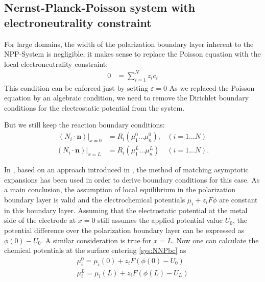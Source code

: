 \documentclass[12pt,oneside,reqno]{amsart}
\numberwithin{equation}{section}
\begin{document}
\subsection{Nernst-Planck-Poisson   system    with   electroneutrality constraint} 
For  large  domains, the  width  of  the polarization  boundary  layer
inherent to  the NPP-System is  negligible, it makes sense  to replace
the Poisson equation with the local electroneutrality constraint:
\begin{align}
  0&= \sum_{i=1}^N z_i c_i \label{eq:eneu}
\end{align}
This condition can be enforced just by setting  $\varepsilon=0$
As we replaced the Poisson equation by an algebraic condition, we need to remove 
the Dirichlet boundary conditions for the electrostatic potential from the system.

But we still keep the reaction boundary conditions:
\begin{subequations}\label{sys:NNPbc}
\begin{align}\
  (N_i\cdot \mathbf n)|_{x=0}&=R_i(\mu_1^0\dots\mu_n^0), & (i=1\dots N)\\
  (N_i\cdot \mathbf n)|_{x=L} &=R_i(\mu_1^L\dots\mu_n^L) & (i=1\dots N).
\end{align}
\end{subequations}

In \cite{guhlke2015theorie}, based on an approach introduced in \cite{caginalp1988dynamics}, the method
of matching asymptotic expansions has been used in order to derive boundary conditions for
this case. As a main conclusion, the assumption of local equilibrium 
in the polarization boundary layer is valid and 
the electrochemical potentials $\mu_i + z_i F \phi$ are constant in this boundary layer. Assuming that the electrostatic
potential at the metal side of the electrode at $x=0$ still assumes the applied potential value $U_0$, the
potential difference over the polarization boundary layer can be expressed as $\phi(0)-U_0$. A
similar consideration is true for $x=L$.
Now one can 
calculate the chemical potentials at the surface entering \eqref{sys:NNPbc} as
\begin{subequations}\label{sys:neubc}
   \begin{align}
     \mu_i^0=\mu_i(0) + z_i F(\phi(0)-U_0)\\
     \mu_i^L=\mu_i(L) + z_i F(\phi(L)-U_L)
   \end{align}
 \end{subequations}
\end{document}
